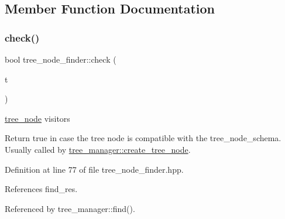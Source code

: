 \subsection{Member Function Documentation}
\mbox{\label{structtree__node__finder_ac06e16fcd94b5b20a811f72e87e48579}} 
\subsubsection{\texorpdfstring{check()}{check()}}
{\footnotesize\ttfamily bool tree\+\_\+node\+\_\+finder\+::check (\begin{DoxyParamCaption}\item[{const \hyperlink{tree__node_8hpp_a6ee377554d1c4871ad66a337eaa67fd5}{tree\+\_\+node\+Ref} \&}]{t }\end{DoxyParamCaption})\hspace{0.3cm}{\ttfamily [inline]}}



\hyperlink{classtree__node}{tree\+\_\+node} visitors 

Return true in case the tree node is compatible with the tree\+\_\+node\+\_\+schema. Usually called by \hyperlink{classtree__manager_a6a73965fdf587f77158f5dc384e037a1}{tree\+\_\+manager\+::create\+\_\+tree\+\_\+node}. 

Definition at line 77 of file tree\+\_\+node\+\_\+finder.\+hpp.



References find\+\_\+res.



Referenced by tree\+\_\+manager\+::find().

